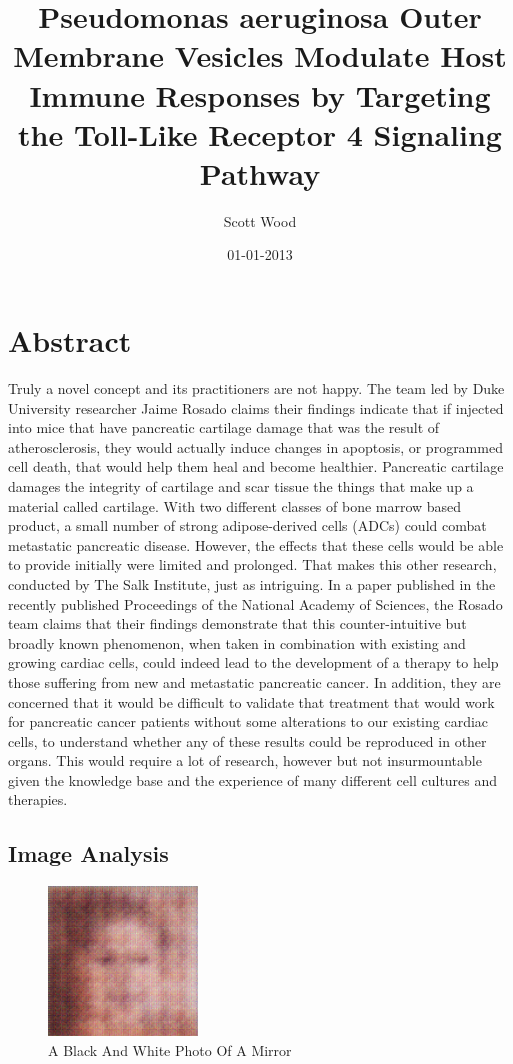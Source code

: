 \documentclass{article}%
\title{Pseudomonas aeruginosa Outer Membrane Vesicles Modulate Host Immune Responses by Targeting the Toll{-}Like Receptor 4 Signaling Pathway}%
\author{Scott Wood}%
\affil{Department of Biochemistry and Molecular Biology, Bengbu Medical College, Bengbu, Anhui, China}%
\date{01{-}01{-}2013}%
\begin{document}
%
\normalsize%
\maketitle%
\section{Abstract}%
\label{sec:Abstract}%
Truly a novel concept  and its practitioners are not happy.\newline%
The team led by Duke University researcher Jaime Rosado claims their findings indicate that if injected into mice that have pancreatic cartilage damage that was the result of atherosclerosis, they would actually induce changes in apoptosis, or programmed cell death, that would help them heal and become healthier.\newline%
Pancreatic cartilage damages the integrity of cartilage and scar tissue  the things that make up a material called cartilage.\newline%
With two different classes of bone marrow based product, a small number of strong adipose{-}derived cells (ADCs) could combat metastatic pancreatic disease.\newline%
However, the effects that these cells would be able to provide initially were limited and prolonged. That makes this other research, conducted by The Salk Institute, just as intriguing.\newline%
In a paper published in the recently published Proceedings of the National Academy of Sciences, the Rosado team claims that their findings demonstrate that this counter{-}intuitive but broadly known phenomenon, when taken in combination with existing and growing cardiac cells, could indeed lead to the development of a therapy to help those suffering from new and metastatic pancreatic cancer.\newline%
In addition, they are concerned that it would be difficult to validate that treatment that would work for pancreatic cancer patients without some alterations to our existing cardiac cells, to understand whether any of these results could be reproduced in other organs. This would require a lot of research, however  but not insurmountable given the knowledge base and the experience of many different cell cultures and therapies.

%
\subsection{Image Analysis}%
\label{subsec:ImageAnalysis}%


\begin{figure}[h!]%
\centering%
\includegraphics[width=150px]{500_fake_images/samples_5_289.png}%
\caption{A Black And White Photo Of A Mirror}%
\end{figure}

%
\end{document}
